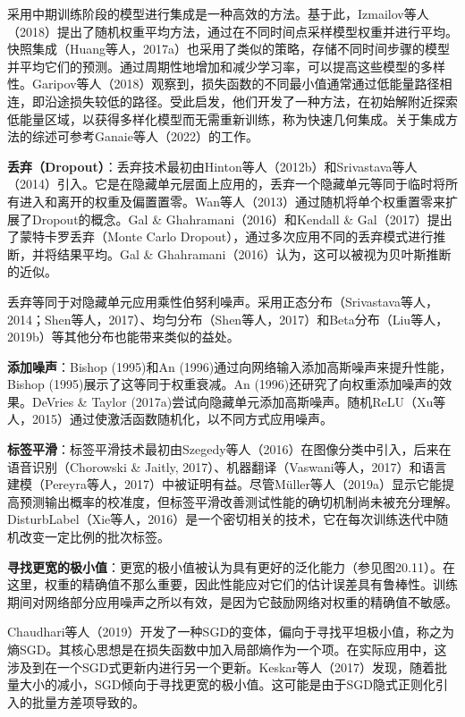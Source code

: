 采用中期训练阶段的模型进行集成是一种高效的方法。基于此，Izmailov等人（2018）提出了随机权重平均方法，通过在不同时间点采样模型权重并进行平均。快照集成（Huang等人，2017a）也采用了类似的策略，存储不同时间步骤的模型并平均它们的预测。通过周期性地增加和减少学习率，可以提高这些模型的多样性。Garipov等人（2018）观察到，损失函数的不同最小值通常通过低能量路径相连，即沿途损失较低的路径。受此启发，他们开发了一种方法，在初始解附近探索低能量区域，以获得多样化模型而无需重新训练，称为快速几何集成。关于集成方法的综述可参考Ganaie等人（2022）的工作。

\textbf{丢弃（Dropout）}：丢弃技术最初由Hinton等人（2012b）和Srivastava等人（2014）引入。它是在隐藏单元层面上应用的，丢弃一个隐藏单元等同于临时将所有进入和离开的权重及偏置置零。Wan等人（2013）通过随机将单个权重置零来扩展了Dropout的概念。Gal \& Ghahramani（2016）和Kendall \& Gal（2017）提出了蒙特卡罗丢弃（Monte Carlo Dropout），通过多次应用不同的丢弃模式进行推断，并将结果平均。Gal \& Ghahramani（2016）认为，这可以被视为贝叶斯推断的近似。

丢弃等同于对隐藏单元应用乘性伯努利噪声。采用正态分布（Srivastava等人，2014；Shen等人，2017）、均匀分布（Shen等人，2017）和Beta分布（Liu等人，2019b）等其他分布也能带来类似的益处。

\textbf{添加噪声}：Bishop (1995)和An (1996)通过向网络输入添加高斯噪声来提升性能，Bishop (1995)展示了这等同于权重衰减。An (1996)还研究了向权重添加噪声的效果。DeVries \& Taylor (2017a)尝试向隐藏单元添加高斯噪声。随机ReLU（Xu等人，2015）通过使激活函数随机化，以不同方式应用噪声。

\textbf{标签平滑}：标签平滑技术最初由Szegedy等人（2016）在图像分类中引入，后来在语音识别（Chorowski \& Jaitly, 2017）、机器翻译（Vaswani等人，2017）和语言建模（Pereyra等人，2017）中被证明有益。尽管Müller等人（2019a）显示它能提高预测输出概率的校准度，但标签平滑改善测试性能的确切机制尚未被充分理解。DisturbLabel（Xie等人，2016）是一个密切相关的技术，它在每次训练迭代中随机改变一定比例的批次标签。

\textbf{寻找更宽的极小值}：更宽的极小值被认为具有更好的泛化能力（参见图20.11）。在这里，权重的精确值不那么重要，因此性能应对它们的估计误差具有鲁棒性。训练期间对网络部分应用噪声之所以有效，是因为它鼓励网络对权重的精确值不敏感。

Chaudhari等人（2019）开发了一种SGD的变体，偏向于寻找平坦极小值，称之为熵SGD。其核心思想是在损失函数中加入局部熵作为一个项。在实际应用中，这涉及到在一个SGD式更新内进行另一个更新。Keskar等人（2017）发现，随着批量大小的减小，SGD倾向于寻找更宽的极小值。这可能是由于SGD隐式正则化引入的批量方差项导致的。

